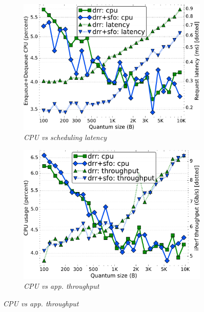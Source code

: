 \begin{figure}[t]
  \centering
    \begin{minipage}[t]{0.48\textwidth}
    \begin{subfigure}[t]{.49\linewidth}
    \includegraphics[width=1\linewidth]{figs/burst_cn_2t4x8_mn_2tb2x4_crs_500_kp_lat_drr_basic_fq_drr.pdf}
    \vspace{-6mm}
    \caption{\small{\textit{CPU vs scheduling latency}}}
	\label{fig:quanta-cpu-lat}
    \end{subfigure}
    \begin{subfigure}[t]{.49\linewidth}
        \centering\includegraphics[width=1\linewidth]{figs/burst_cn_6t1x10_mss_1000_kp_bw_drr_basic_fq_drr.pdf}
         \vspace{-6mm}
		\caption{\small{\textit{CPU vs app. throughput}}}

\end{subfigure}
\end{minipage}
\end{figure}

